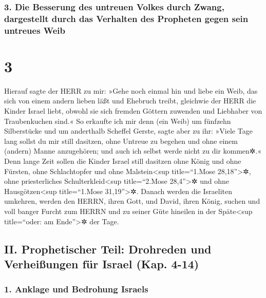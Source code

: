 \hypertarget{die-besserung-des-untreuen-volkes-durch-zwang-dargestellt-durch-das-verhalten-des-propheten-gegen-sein-untreues-weib}{%
\subsubsection{3. Die Besserung des untreuen Volkes durch Zwang,
dargestellt durch das Verhalten des Propheten gegen sein untreues
Weib}\label{die-besserung-des-untreuen-volkes-durch-zwang-dargestellt-durch-das-verhalten-des-propheten-gegen-sein-untreues-weib}}

\hypertarget{section-2}{%
\section{3}\label{section-2}}

 Hierauf sagte der HERR zu mir: »Gehe noch einmal hin und
liebe ein Weib, das sich von einem andern lieben läßt und Ehebruch
treibt, gleichwie der HERR die Kinder Israel liebt, obwohl sie sich
fremden Göttern zuwenden und Liebhaber von Traubenkuchen sind.«
 So erkaufte ich mir denn (ein Weib) um fünfzehn
Silberstücke und um anderthalb Scheffel Gerste,  sagte
aber zu ihr: »Viele Tage lang sollst du mir still dasitzen, ohne Untreue
zu begehen und ohne einem (andern) Manne anzugehören; und auch ich
selbst werde nicht zu dir kommen✲.«  Denn lange Zeit
sollen die Kinder Israel still dasitzen ohne König und ohne Fürsten,
ohne Schlachtopfer und ohne Malstein\textless sup title=``1.Mose
28,18''\textgreater✲, ohne priesterliches Schulterkleid\textless sup
title=``2.Mose 28,4''\textgreater✲ und ohne Hausgötzen\textless sup
title=``1.Mose 31,19''\textgreater✲.  Danach werden die
Israeliten umkehren, werden den HERRN, ihren Gott, und David, ihren
König, suchen und voll banger Furcht zum HERRN und zu seiner Güte
hineilen in der Späte\textless sup title=``oder: am Ende''\textgreater✲
der Tage.

\hypertarget{ii.-prophetischer-teil-drohreden-und-verheiuxdfungen-fuxfcr-israel-kap.-4-14}{%
\subsection{II. Prophetischer Teil: Drohreden und Verheißungen für
Israel (Kap.
4-14)}\label{ii.-prophetischer-teil-drohreden-und-verheiuxdfungen-fuxfcr-israel-kap.-4-14}}

\hypertarget{anklage-und-bedrohung-israels}{%
\subsubsection{1. Anklage und Bedrohung
Israels}\label{anklage-und-bedrohung-israels}}

